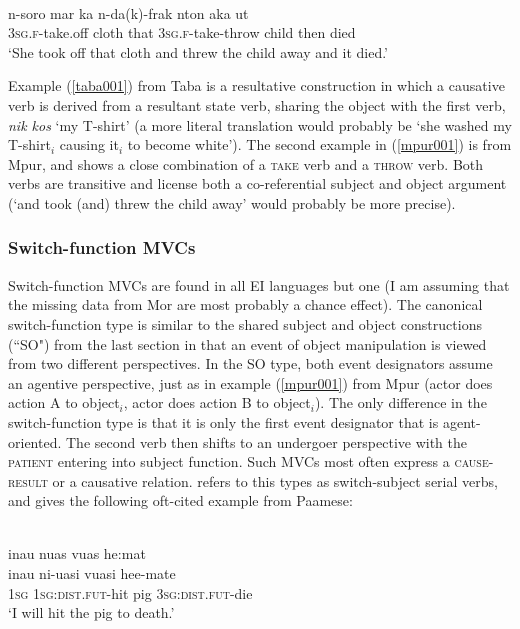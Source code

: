 \ea \label{mpur001}
\\
\gll n-soro mar ka n-da(k)-frak nton aka ut \\
3\textsc{sg}.\textsc{f}-take.off cloth that 3\textsc{sg}.\textsc{f}-take-throw child then died \\
\glft `She took off that cloth and threw the child away and it died.'\\ 
\z

Example (\ref{taba001}) from Taba is a resultative construction in which a causative verb is derived from a resultant state verb, sharing the object with the first verb, \textit{nik kos} `my T-shirt' (a more literal translation would probably be `she washed my T-shirt$_i$ causing it$_i$ to become white'). The second example in (\ref{mpur001}) is from Mpur, and shows a close combination of a \textsc{take} verb and a \textsc{throw} verb. Both verbs are transitive and license both a co-referential subject and object argument (`and took (and) threw the child away' would probably be more precise).

\subsubsection{Switch-function MVCs}

Switch-function MVCs are found in all EI languages but one (I am assuming that the missing data from Mor are most probably a chance effect). The canonical switch-function type is similar to the shared subject and object constructions (``SO") from the last section in that an event of object manipulation is viewed from two different perspectives. In the SO type, both event designators assume an agentive perspective, just as in example (\ref{mpur001}) from Mpur (actor does action A to object$_i$, actor does action B to object$_i$). The only difference in the switch-function type is that it is only the first event designator that is agent-oriented. The second verb then shifts to an undergoer perspective with the \textsc{patient} entering into subject function. Such MVCs most often express a \textsc{cause-result} or a causative relation. \citet{crowley2002serial} refers to this types as switch-subject serial verbs, and gives the following oft-cited example from Paamese:

\ea 
{}\\
\glll inau nuas vuas he:mat \\
inau ni-uasi vuasi hee-mate \\
1\textsc{sg} 1\textsc{sg}:\textsc{dist}.\textsc{fut}-hit pig 3\textsc{sg}:\textsc{dist}.\textsc{fut}-die \\
\glft `I will hit the pig to death.'\\ 
\z

